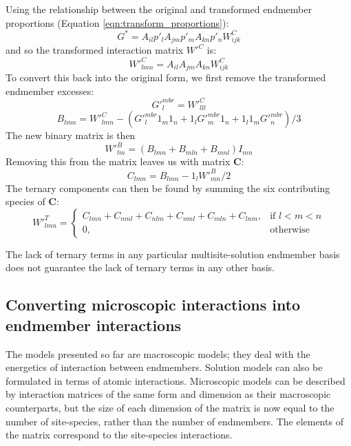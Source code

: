 \documentclass[preprint,12pt]{elsarticle}
\begin{document}
Using the relationship between the original and transformed endmember proportions (Equation \ref{eqn:transform_proportions}):
\begin{equation}
    G^* = A_{il} p'_l A_{jm} p'_m A_{kn} p'_n W^C_{ijk}
\end{equation}
and so the transformed interaction matrix $W'^C$ is:
\begin{equation}
    W'^{C}_{lmn} = A_{il}A_{jm}A_{kn}W_{ijk}^C
\end{equation}
To convert this back into the original form, we first remove the transformed endmember excesses:
\begin{equation}
    G'^{mbr}_l = W'^{C}_{lll}
\end{equation}
\begin{equation}
    B_{lmn} = W'^{C}_{lmn} - (G'^{mbr}_l 1_m 1_n + 1_l G'^{mbr}_m 1_n + 1_l 1_m G'^{mbr}_n)/3
\end{equation}
The new binary matrix is then
\begin{equation}
    W'^B_{lm} = (B_{lmn} + B_{mln} + B_{mnl}) I_{mn}
\end{equation}
Removing this from the matrix leaves us with matrix $\boldsymbol{C}$:
\begin{equation}
    C_{lmn} = B_{lmn} - 1_l W'^B_{mn}/2
\end{equation}
The ternary components can then be found by summing the six contributing species of $\boldsymbol{C}$:
\begin{equation}
    W'^T_{lmn} = 
    \begin{cases}
        C_{lmn} + C_{mnl} + C_{nlm} + C_{nml} + C_{mln} + C_{lnm},& \text{if } l<m<n\\
        0,              & \text{otherwise}
    \end{cases}
\end{equation}

The lack of ternary terms in any particular multisite-solution endmember basis does not guarantee the lack of ternary terms in any other basis.

\subsection{Converting microscopic interactions into endmember interactions}
\label{sec:micro_to_macro}
The models presented so far are macroscopic models; they deal with the energetics of interaction between endmembers. Solution models can also be formulated in terms of atomic interactions. Microscopic models can be described by interaction matrices of the same form and dimension as their macroscopic counterparts, but the size of each dimension of the matrix is now equal to the number of site-species, rather than the number of endmembers. The elements of the matrix correspond to the site-species interactions. 
\end{document}
